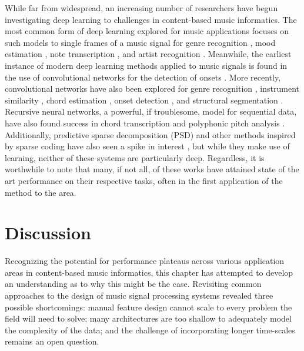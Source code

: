 While far from widespread, an increasing number of researchers have begun investigating deep learning to challenges in content-based music informatics.
The most common form of deep learning explored for music applications focuses on such models to single frames of a music signal for genre recognition \cite{Hamel2009Automatic}, mood estimation \cite{Schmidt2011Modeling}, note transcription \cite{Nam2011Classification}, and artist recognition \cite{Dieleman2011Audio}.
Meanwhile, the earliest instance of modern deep learning methods applied to music signals is found in the use of convolutional networks for the detection of onsets \cite{Lacoste2007Supervised}.
More recently, convolutional networks have also been explored for genre recognition \cite{Li2010Automatic}, instrument similarity \cite{Humphrey2011Nonlinear}, chord estimation \cite{Humphrey2012Learning, Humphrey2012Rethinking}, onset detection \cite{Schluter2014Improved}, and structural segmentation \cite{Ullrich2014Boundary}.
Recursive neural networks, a powerful, if troublesome, model for sequential data, have also found success in chord transcription \cite{Boulanger2013Audio} and polyphonic pitch analysis \cite{Sigtia2014RNN}.
Additionally, predictive sparse decomposition (PSD) and other methods inspired by sparse coding have also seen a spike in interest \cite{Henaff2011Unsupervised, Nam2012Learning}, but while they make use of learning, neither of these systems are particularly deep.
Regardless, it is worthwhile to note that many, if not all, of these works have attained state of the art performance on their respective tasks, often in the first application of the method to the area.



\section{Discussion}
\label{sec:discussion}

Recognizing the potential for performance plateaus across various application areas in content-based music informatics, this chapter has attempted to develop an understanding as to why this might be the case.
Revisiting common approaches to the design of music signal processing systems revealed three possible shortcomings:
manual feature design cannot scale to every problem the field will need to solve;
many architectures are too shallow to adequately model the complexity of the data;
and the challenge of incorporating longer time-scales remains an open question.

